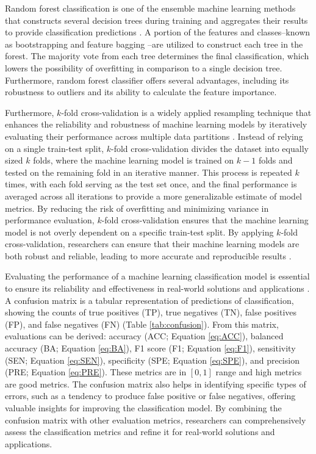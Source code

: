 \documentclass[11pt, a4paper, onecolumn, oneside]{report}
\begin{document}
        Random forest classification is one of the ensemble machine learning methods that constructs several decision trees during training and aggregates their results to provide classification predictions \cite{RF-1, RF-8}. A portion of the features and classes--known as bootstrapping \cite{RF-2, RF-3, RF-4} and feature bagging \cite{RF-5, RF-6, RF-7}--are utilized to construct each tree in the forest. The majority vote from each tree determines the final classification, which lowers the possibility of overfitting in comparison to a single decision tree. Furthermore, random forest classifier offers several advantages, including its robustness to outliers and its ability to calculate the feature importance.

        Furthermore, $k$-fold cross-validation is a widely applied resampling technique that enhances the reliability and robustness of machine learning models by iteratively evaluating their performance across multiple data partitions \cite{Kfold-1, Kfold-2}. Instead of relying on a single train-test split, $k$-fold cross-validation divides the dataset into equally sized $k$ folds, where the machine learning model is trained on $k-1$ folds and tested on the remaining fold in an iterative manner. This process is repeated $k$ times, with each fold serving as the test set once, and the final performance is averaged across all iterations to provide a more generalizable estimate of model metrics. By reducing the risk of overfitting and minimizing variance in performance evaluation, $k$-fold cross-validation ensures that the machine learning model is not overly dependent on a specific train-test split. By applying $k$-fold cross-validation, researchers can ensure that their machine learning models are both robust and reliable, leading to more accurate and reproducible results \cite{Kfold-3}.

        Evaluating the performance of a machine learning classification model is essential to ensure its reliability and effectiveness in real-world solutions and applications \cite{classification-evaluation-1, classification-evaluation-5, classification-evaluation-6}. A confusion matrix is a tabular representation of predictions of classification, showing the counts of true positives (TP), true negatives (TN), false positives (FP), and false negatives (FN) (Table \ref{tab:confusion}). From this matrix, evaluations can be derived: accuracy (ACC; Equation \ref{eq:ACC}), balanced accuracy (BA; Equation \ref{eq:BA}), F1 score (F1; Equation \ref{eq:F1}), sensitivity (SEN; Equation \ref{eq:SEN}), specificity (SPE; Equation \ref{eq:SPE}), and precision (PRE; Equation \ref{eq:PRE}). These metrics are in $[0, 1]$ range and high metrics are good metrics. The confusion matrix also helps in identifying specific types of errors, such as a tendency to produce false positive or false negatives, offering valuable insights for improving the classification model. By combining the confusion matrix with other evaluation metrics, researchers can comprehensively assess the classification metrics and refine it for real-world solutions and applications.
\end{document}
